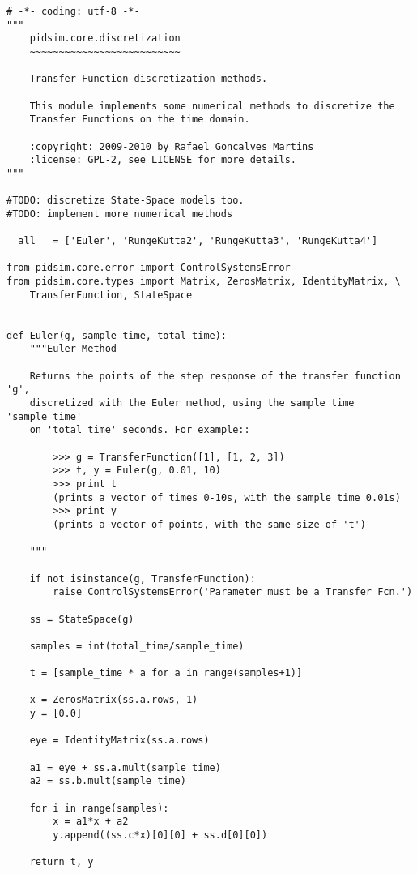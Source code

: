     \footnotesize
    \begin{verbatim}
# -*- coding: utf-8 -*-
"""
    pidsim.core.discretization
    ~~~~~~~~~~~~~~~~~~~~~~~~~~

    Transfer Function discretization methods.
    
    This module implements some numerical methods to discretize the
    Transfer Functions on the time domain.
    
    :copyright: 2009-2010 by Rafael Goncalves Martins
    :license: GPL-2, see LICENSE for more details.
"""

#TODO: discretize State-Space models too.
#TODO: implement more numerical methods

__all__ = ['Euler', 'RungeKutta2', 'RungeKutta3', 'RungeKutta4']

from pidsim.core.error import ControlSystemsError
from pidsim.core.types import Matrix, ZerosMatrix, IdentityMatrix, \
    TransferFunction, StateSpace


def Euler(g, sample_time, total_time):
    """Euler Method
    
    Returns the points of the step response of the transfer function 'g',
    discretized with the Euler method, using the sample time 'sample_time'
    on 'total_time' seconds. For example::
    
        >>> g = TransferFunction([1], [1, 2, 3])
        >>> t, y = Euler(g, 0.01, 10)
        >>> print t
        (prints a vector of times 0-10s, with the sample time 0.01s)
        >>> print y
        (prints a vector of points, with the same size of 't')
    
    """
    
    if not isinstance(g, TransferFunction):
        raise ControlSystemsError('Parameter must be a Transfer Fcn.')

    ss = StateSpace(g)
    
    samples = int(total_time/sample_time)
    
    t = [sample_time * a for a in range(samples+1)]
    
    x = ZerosMatrix(ss.a.rows, 1)
    y = [0.0]
    
    eye = IdentityMatrix(ss.a.rows)
    
    a1 = eye + ss.a.mult(sample_time)
    a2 = ss.b.mult(sample_time)
    
    for i in range(samples):
        x = a1*x + a2
        y.append((ss.c*x)[0][0] + ss.d[0][0])

    return t, y



\end{verbatim}
